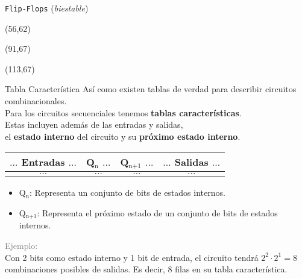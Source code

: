 \documentclass[aspectratio=169]{beamer}
\begin{document}
\begin{frame}[t]{\texttt{Flip-Flops} (\emph{biestable})}
    \begin{textblock}{65}(56,62)  \end{textblock} %
    \begin{textblock}{65}(91,67)  \end{textblock} %
    \begin{textblock}{38}(113,67)  \end{textblock}
\end{frame}

\begin{frame}[t]{Tabla Característica}
    Así como existen tablas de verdad para describir circuitos combinacionales.\\
    Para los circuitos secuenciales tenemos \textbf{tablas características}.\\
    \bigskip
    \pause
    Estas incluyen además de las entradas y salidas,\\ el \textbf{estado interno} del circuito y su \textbf{próximo estado interno}.\\
    \bigskip
    \begin{center}
    \begin{tabular}{c|c||c|c}
    $\dots$ Entradas $\dots$ & Q$_\text{n}$ $\dots$ & Q$_\text{n+1}$ $\dots$ & $\dots$ Salidas $\dots$ \\ \hline
    $\dots$ & $\dots$ & $\dots$ & $\dots$ \\
    \end{tabular}
    \end{center}
    \begin{itemize}
     \item Q$_\text{n}$: Representa un conjunto de bits de estados internos.
     \item Q$_\text{n+1}$: Representa el próximo estado de un conjunto de bits de estados internos.
    \end{itemize}
    \pause
    \bigskip
    \textcolor{gray}{Ejemplo:}\\
    \small Con 2 bits como estado interno y 1 bit de entrada, el circuito tendrá $2^2 \cdot 2^1 = 8$ combinaciones posibles de salidas. Es decir, 8 filas en su tabla característica.
\end{frame}
\end{document}
